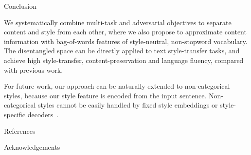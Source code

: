 \documentclass[final]{beamer}
\newlength{\onecolwid}
\begin{document}
\begin{frame}[t]
\begin{columns}[t]
\begin{column}{\onecolwid}
            \begin{block}{Conclusion}

                We systematically combine multi-task and adversarial objectives to separate content and style from each other, where we also propose to approximate content information with bag-of-words features of style-neutral, non-stopword vocabulary.
                The disentangled space can be directly applied to text style-transfer tasks, and achieve high style-transfer, content-preservation and language fluency, compared with previous work.

                For future work, our approach can be naturally extended to non-categorical styles, because our style feature is encoded from the input sentence. Non-categorical styles cannot be easily handled by fixed style embeddings \cite{shen2017style} or style-specific decoders~\cite{fu2018style}.
            \end{block}


            \begin{block}{References}

                \small{
                    \vspace{0.75in}}

            \end{block}



            \begin{block}{Acknowledgements}

                \small{} \\

            \end{block}


\end{column}
\end{columns}
\end{frame}
\end{document}
